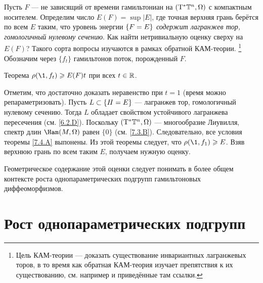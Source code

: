 Пусть $F$ — не зависящий от времени гамильтониан на $(\mathrm{T}^\ast \mathbb{T}^n, \Omega)$ с компактным
носителем. 
Определим число $E(F)=\sup|E|$, где точная верхняя грань берётся
по всем $E$ таким, что уровень энергии $\{F \z= E\}$ \textit{содержит
лагранжев тор, гомологичный нулевому сечению}. 
Как найти нетривиальную оценку сверху на $E (F)$?
Такого сорта вопросы изучаются в рамках обратной КАМ-теории.%
\footnote{Цель КАМ-теории — доказать существование инвариантных
  лагранжевых торов, в то время как обратная КАМ-теория изучает
  препятствия к их существованию, см. например \cite{Mac} и
  приведённые там ссылки.} 
Обозначим через $\{f_t\}$ гамильтонов поток, порожденный $F$.

\begin{thm}[(ср. \cite{BP2,P8})
]{Теорема}\label{8.1.C}
  $\rho (\1, f_t) \ge E (F) t$ при всех $t \z\in \RR$.
\end{thm}

Отметим, что достаточно доказать неравенство при $t = 1$ (время можно
репараметризовать).  
Пусть $L \z\subset \{H = E\}$ — лагранжев тор, гомологичный нулевому сечению.
Тогда $L$ обладает свойством устойчивого лагранжева пересечения
(см. \ref{6.2.D}). 
Поскольку $(\mathrm{T}^\ast \mathbb{T}^n, \Omega)$ — многообразие Лиувилля, спектр
длин $\Ham (M, \Omega)$ равен $\{0\}$ (см. \ref{7.3.B}). 
Следовательно, все условия теоремы \ref{7.4.A} выпонены. 
Из этой теоремы следует, что $\rho (\1, f_1) \ge E$. 
Взяв верхнюю грань по всем таким $E$, получаем нужную оценку.
\qeds

Геометрическое содержание этой оценки следует понимать в более общем
контексте роста однопараметрических подгрупп гамильтоновых
диффеоморфизмов. 


\section{Рост однопараметрических подгрупп}\label{sec:8.2}

